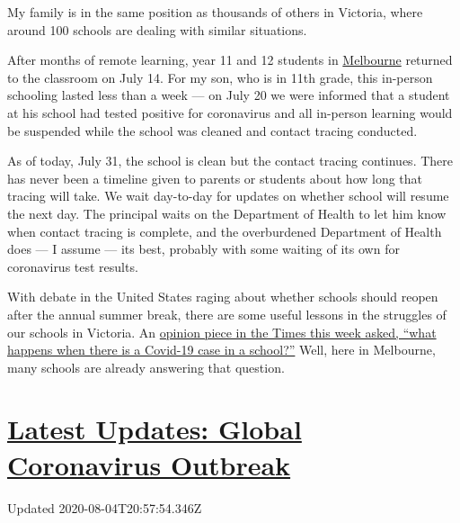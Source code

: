 My family is in the same position as thousands of others in Victoria,
where around 100 schools are dealing with similar situations.

After months of remote learning, year 11 and 12 students in
\href{https://www.nytimes.com/2020/08/04/world/australia/coronavirus-melbourne-lockdown.html}{Melbourne}
returned to the classroom on July 14. For my son, who is in 11th grade,
this in-person schooling lasted less than a week --- on July 20 we were
informed that a student at his school had tested positive for
coronavirus and all in-person learning would be suspended while the
school was cleaned and contact tracing conducted.

As of today, July 31, the school is clean but the contact tracing
continues. There has never been a timeline given to parents or students
about how long that tracing will take. We wait day-to-day for updates on
whether school will resume the next day. The principal waits on the
Department of Health to let him know when contact tracing is complete,
and the overburdened Department of Health does --- I assume --- its
best, probably with some waiting of its own for coronavirus test
results.

With debate in the United States raging about whether schools should
reopen after the annual summer break, there are some useful lessons in
the struggles of our schools in Victoria. An
\href{https://www.nytimes.com/2020/07/28/opinion/coronavirus-schools-reopening.html?searchResultPosition=2}{opinion
piece in the Times this week asked, ``what happens when there is a
Covid-19 case in a school?''} Well, here in Melbourne, many schools are
already answering that question.

\hypertarget{latest-updates-global-coronavirus-outbreak}{%
\section{\texorpdfstring{\href{https://www.nytimes.com/2020/08/04/world/coronavirus-cases.html?action=click\&pgtype=Article\&state=default\&region=MAIN_CONTENT_1\&context=storylines_live_updates}{Latest
Updates: Global Coronavirus
Outbreak}}{Latest Updates: Global Coronavirus Outbreak}}\label{latest-updates-global-coronavirus-outbreak}}

Updated 2020-08-04T20:57:54.346Z

